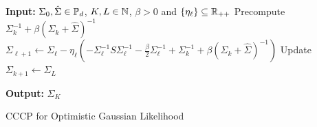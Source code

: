 \documentclass[sn-nature]{sn-jnl}%
\theoremstyle{thmstyleone}%
\theoremstyle{thmstyletwo}%
\theoremstyle{thmstylethree}%
\begin{document}
%
\begin{algorithm}[H]
\small 
\SetAlgoLined
\textbf{Input:} $\Sigma_0, \hat{\Sigma} \in \mathbb{P}_d$, $K, L \in \mathbb{N}$, $\beta > 0$ and $\{\eta_\ell\} \subseteq \mathbb{R}_{++}$
 \State Precompute $\Sigma_k^{-1} + \beta \left( \Sigma_k + \hat{\Sigma} \right)^{-1}$ 
    \State $\Sigma_{\ell+1} \leftarrow  \Sigma_\ell - \eta_\ell \left( -\Sigma_\ell^{-1} S \Sigma_\ell^{-1} - \frac{\beta}{2}\Sigma_\ell^{-1} + \Sigma_k^{-1} + \beta \left(\Sigma_k + \hat{\Sigma}\right)^{-1} \right) $
    \State Update $\Sigma_{k+1} \leftarrow \Sigma_{L}$

\textbf{Output:} $\Sigma_K$

 \caption{CCCP for Optimistic Gaussian Likelihood}\label{alg:CCCP_on_MLE}
\end{algorithm}
%
\end{document}
